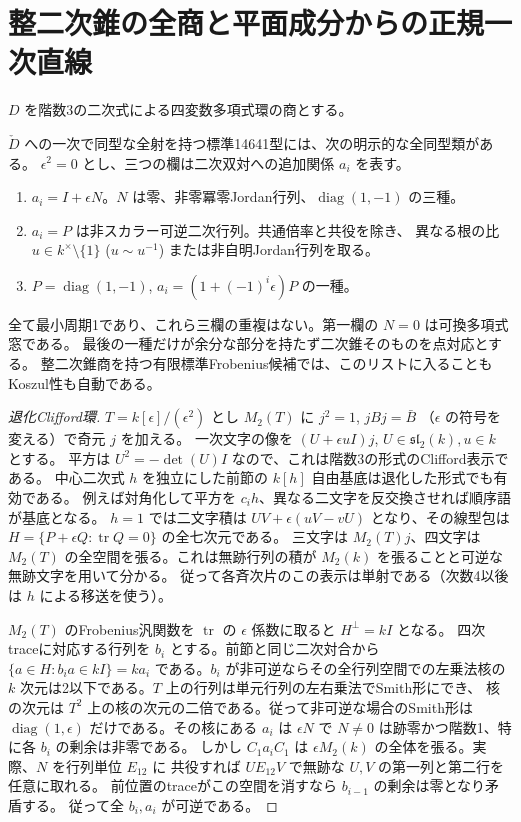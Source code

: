 \section{整二次錐の全商と平面成分からの正規一次直線}
\label{sec:quadric-cone-quotients}
$D$ を階数3の二次式による四変数多項式環の商とする。
\begin{theorem}\label{thm:quadric-cone-quotients}
$\check D$ への一次で同型な全射を持つ標準14641型には、次の明示的な全同型類がある。
$\epsilon^2=0$ とし、三つの欄は二次双対への追加関係 $a_i$ を表す。
\begin{enumerate}
\item $a_i=I+\epsilon N$。$N$ は零、非零冪零Jordan行列、$\operatorname{diag}(1,-1)$ の三種。
\item $a_i=P$ は非スカラー可逆二次行列。共通倍率と共役を除き、
異なる根の比 $u\in k^\times\setminus\{1\}$ ($u\sim u^{-1}$) または非自明Jordan行列を取る。
\item $P=\operatorname{diag}(1,-1)$, $a_i=(1+(-1)^i\epsilon)P$ の一種。
\end{enumerate}
全て最小周期1であり、これら三欄の重複はない。第一欄の $N=0$ は可換多項式窓である。
最後の一種だけが余分な部分を持たず二次錐そのものを点対応とする。
整二次錐商を持つ有限標準Frobenius候補では、このリストに入ることもKoszul性も自動である。
\end{theorem}
\begin{proof}[退化Clifford環]
$T=k[\epsilon]/(\epsilon^2)$ とし $M_2(T)$ に $j^2=1$, $jBj=\bar B$
（$\epsilon$ の符号を変える）で奇元 $j$ を加える。
一次文字の像を $(U+\epsilon uI)j$, $U\in\mathfrak{sl}_2(k),u\in k$ とする。
平方は $U^2=-\det(U)I$ なので、これは階数3の形式のClifford表示である。
中心二次式 $h$ を独立にした前節の $k[h]$ 自由基底は退化した形式でも有効である。
例えば対角化して平方を $c_i h$、異なる二文字を反交換させれば順序語が基底となる。
$h=1$ では二文字積は $UV+\epsilon(uV-vU)$ となり、その線型包は
$H=\{P+\epsilon Q:\operatorname{tr} Q=0\}$ の全七次元である。
三文字は $M_2(T)j$、四文字は $M_2(T)$ の全空間を張る。これは無跡行列の積が
$M_2(k)$ を張ることと可逆な無跡文字を用いて分かる。
従って各斉次片のこの表示は単射である（次数4以後は $h$ による移送を使う）。

$M_2(T)$ のFrobenius汎関数を $\operatorname{tr}$ の $\epsilon$ 係数に取ると $H^\perp=kI$ となる。
四次traceに対応する行列を $b_i$ とする。前節と同じ二次対合から
$\{a\in H:b_i a\in kI\}=ka_i$ である。$b_i$ が非可逆ならその全行列空間での左乗法核の
$k$ 次元は2以下である。$T$ 上の行列は単元行列の左右乗法でSmith形にでき、
核の次元は $T^2$ 上の核の次元の二倍である。従って非可逆な場合のSmith形は
$\operatorname{diag}(1,\epsilon)$ だけである。その核にある $a_i$ は
$\epsilon N$ で $N\ne0$ は跡零かつ階数1、特に各 $b_i$ の剰余は非零である。
しかし $C_1a_i C_1$ は $\epsilon M_2(k)$ の全体を張る。実際、$N$ を行列単位 $E_{12}$ に
共役すれば $U E_{12} V$ で無跡な $U,V$ の第一列と第二行を任意に取れる。
前位置のtraceがこの空間を消すなら $b_{i-1}$ の剰余は零となり矛盾する。
従って全 $b_i,a_i$ が可逆である。
\end{proof}

